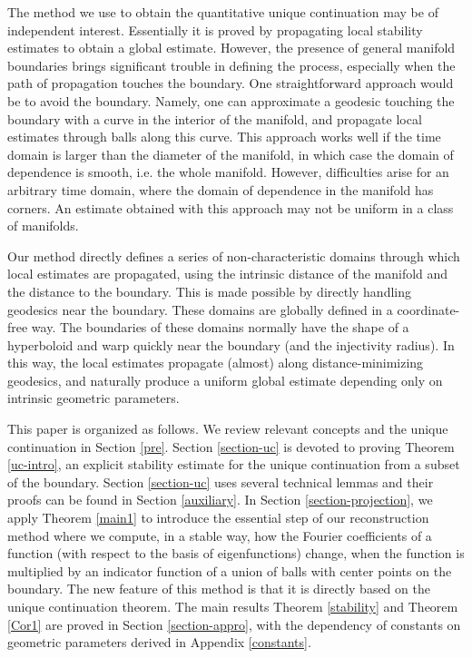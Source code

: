 \documentclass[11pt,letterpaper]{amsart}
\numberwithin{equation}{section}
\theoremstyle{definition}
\theoremstyle{plain}
\theoremstyle{definition}
\theoremstyle{plain}
\theoremstyle{definition}
\theoremstyle{plain}
\begin{document}
The method we use to obtain the quantitative unique continuation may be of independent interest. Essentially it is proved by propagating local stability estimates to obtain a global estimate. However, the presence of general manifold boundaries brings significant trouble in defining the process, especially when the path of propagation touches the boundary. One straightforward approach would be to avoid the boundary. Namely, one can approximate a geodesic touching the boundary with a curve in the interior of the manifold, and propagate local estimates through balls along this curve. This approach works well if the time domain is larger than the diameter of the manifold, in which case the domain of dependence is smooth, i.e. the whole manifold. However, difficulties arise for an arbitrary time domain, where the domain of dependence in the manifold has corners. An estimate obtained with this approach may not be uniform in a class of manifolds.

Our method directly defines a series of non-characteristic domains through which local estimates are propagated, using the intrinsic distance of the manifold and the distance to the boundary. This is made possible by directly handling geodesics near the boundary. These domains are globally defined in a coordinate-free way. The boundaries of these domains normally have the shape of a hyperboloid  and warp quickly near the boundary (and the injectivity radius). In this way, the local estimates propagate (almost) along distance-minimizing geodesics, and naturally produce a uniform global estimate depending only on intrinsic geometric parameters.


\smallskip
This paper is organized as follows. We review relevant concepts and the unique continuation in Section \ref{pre}. Section \ref{section-uc} is devoted to proving Theorem \ref{uc-intro}, an explicit stability estimate for the unique continuation from a subset of the boundary. Section \ref{section-uc} uses several technical lemmas and their proofs can be found in Section \ref{auxiliary}. In Section \ref{section-projection}, we apply Theorem \ref{main1} to introduce
the essential step of our reconstruction method where we compute, in a stable way, how the Fourier coefficients of a function (with respect to the basis of eigenfunctions) change, when the function is multiplied by an indicator function of a union of balls with center points on the boundary. 
 The new feature of this method is that it is directly based on the unique continuation theorem.
 The main results Theorem \ref{stability} and Theorem \ref{Cor1} are proved in Section \ref{section-appro}, with the dependency of constants on geometric parameters derived in Appendix \ref{constants}.
\end{document}
